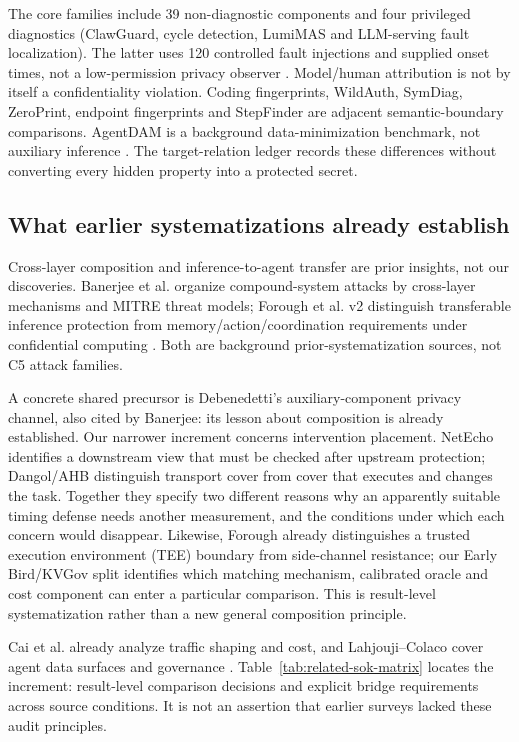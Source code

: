 The \FinalCore{} core families include 39 non-diagnostic components and four privileged diagnostics (ClawGuard, cycle detection, LumiMAS and LLM-serving fault localization). The latter uses 120 controlled fault injections and supplied onset times, not a low-permission privacy observer \cite{scheinert2026rca}. Model/human attribution is not by itself a confidentiality violation. Coding fingerprints, WildAuth, SymDiag, ZeroPrint, endpoint fingerprints and StepFinder are adjacent semantic-boundary comparisons. AgentDAM is a background data-minimization benchmark, not auxiliary inference \cite{ghaleb2026codingfingerprint,wang2026dialogue,cui2026symdiag,agentdam2025}. The target-relation ledger records these differences without converting every hidden property into a protected secret.

\subsection{What earlier systematizations already establish}
Cross-layer composition and inference-to-agent transfer are prior insights, not our discoveries. Banerjee et al. organize compound-system attacks by cross-layer mechanisms and MITRE threat models; Forough et al. v2 distinguish transferable inference protection from memory/action/coordination requirements under confidential computing \cite{banerjee2024compound,forough2026secrets}. Both are background prior-systematization sources, not C5 attack families.

A concrete shared precursor is Debenedetti's auxiliary-component privacy channel, also cited by Banerjee: its lesson about composition is already established. Our narrower increment concerns intervention placement. NetEcho identifies a downstream view that must be checked after upstream protection; Dangol/AHB distinguish transport cover from cover that executes and changes the task. Together they specify two different reasons why an apparently suitable timing defense needs another measurement, and the conditions under which each concern would disappear. Likewise, Forough already distinguishes a trusted execution environment (TEE) boundary from side-channel resistance; our Early Bird/KVGov split identifies which matching mechanism, calibrated oracle and cost component can enter a particular comparison. This is result-level systematization rather than a new general composition principle.

Cai et al. already analyze traffic shaping and cost, and Lahjouji--Colaco cover agent data surfaces and governance \cite{cai2014systematic,lahjouji2026datacentric}. Table~\ref{tab:related-sok-matrix} locates the increment: result-level comparison decisions and explicit bridge requirements across source conditions. It is not an assertion that earlier surveys lacked these audit principles.


